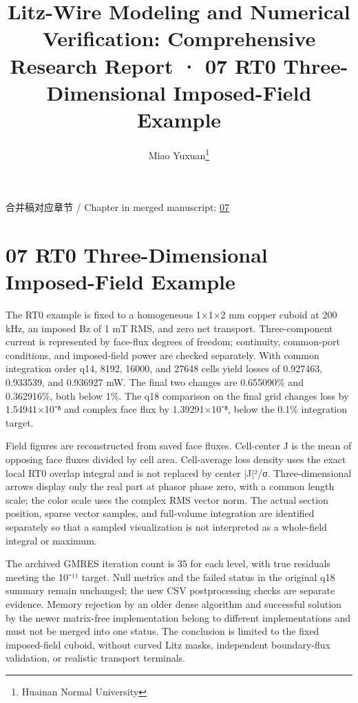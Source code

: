 \documentclass[journal,10pt]{IEEEtran}
\begin{document}
\title{Litz-Wire Modeling and Numerical Verification: Comprehensive Research Report · 07 RT0 Three-Dimensional Imposed-Field Example}
\author{Miao Yuxuan\thanks{Huainan Normal University}}

\maketitle
\noindent 合并稿对应章节 / Chapter in merged manuscript: \href{report_en_ieee.pdf#chapter-07}{07}\par
\FloatBarrier
\section*{07 RT0 Three-Dimensional Imposed-Field Example}
\hypertarget{chapter-07}{}
The RT0 example is fixed to a homogeneous 1×1×2 mm copper cuboid at 200 kHz, an imposed Bz of 1 mT RMS, and zero net transport. Three-component current is represented by face-flux degrees of freedom; continuity, common-port conditions, and imposed-field power are checked separately. With common integration order q14, 8192, 16000, and 27648 cells yield losses of 0.927463, 0.933539, and 0.936927 mW. The final two changes are 0.655090\% and 0.362916\%, both below 1\%. The q18 comparison on the final grid changes loss by 1.54941×10⁻⁸ and complex face flux by 1.39291×10⁻⁸, below the 0.1\% integration target.


Field figures are reconstructed from saved face fluxes. Cell-center J is the mean of opposing face fluxes divided by cell area. Cell-average loss density uses the exact local RT0 overlap integral and is not replaced by center |J|²/σ. Three-dimensional arrows display only the real part at phasor phase zero, with a common length scale; the color scale uses the complex RMS vector norm. The actual section position, sparse vector samples, and full-volume integration are identified separately so that a sampled visualization is not interpreted as a whole-field integral or maximum.


The archived GMRES iteration count is 35 for each level, with true residuals meeting the 10⁻¹¹ target. Null metrics and the failed status in the original q18 summary remain unchanged; the new CSV postprocessing checks are separate evidence. Memory rejection by an older dense algorithm and successful solution by the newer matrix-free implementation belong to different implementations and must not be merged into one status. The conclusion is limited to the fixed imposed-field cuboid, without curved Litz masks, independent boundary-flux validation, or realistic transport terminals.
\end{document}
